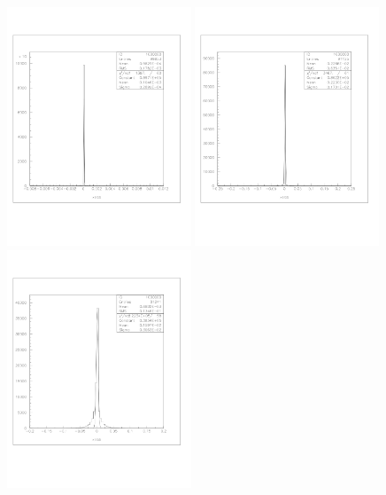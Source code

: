 \documentclass[a4paper]{article}
\begin{document}
\begin{figure}[!htb]
  \centering
  \includegraphics[width=0.49\textwidth]{ex_images/1_010_010_xs.jpg}
  \includegraphics[width=0.49\textwidth]{ex_images/1_010_030_xs.jpg}
  \includegraphics[width=0.49\textwidth]{ex_images/1_010_050_xs.jpg}

\end{figure}
\end{document}
